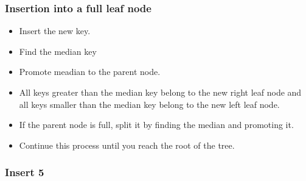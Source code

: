 \documentclass{beamer}
\begin{document}
\begin{frame}
\frametitle{Insertion into a full leaf node}
\begin{itemize}
\item Insert the new key.
\item Find the median key
\item Promote meadian to the parent node.
\item All keys greater than the median key belong to the new right leaf node and all keys smaller than the median key belong to the new left leaf node.
\item If the parent node is full, split it by finding the median and promoting it.
\item Continue this process until you reach the root of the tree.
\end{itemize}
\end{frame}


\begin{frame}
\frametitle{Insert 5}
\begin{center}


\end{center}

\end{frame}
\end{document}
